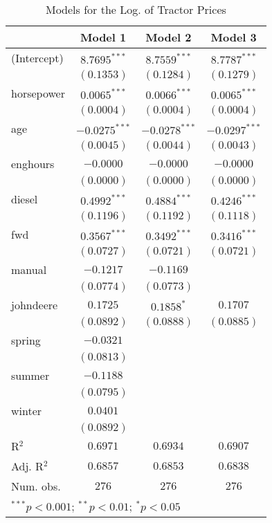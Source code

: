 
\begin{table}
\begin{center}
\begin{tabular}{l c c c}
\hline
 & Model 1 & Model 2 & Model 3 \\
\hline
(Intercept) & $8.7695^{***}$  & $8.7559^{***}$  & $8.7787^{***}$  \\
            & $(0.1353)$      & $(0.1284)$      & $(0.1279)$      \\
horsepower  & $0.0065^{***}$  & $0.0066^{***}$  & $0.0065^{***}$  \\
            & $(0.0004)$      & $(0.0004)$      & $(0.0004)$      \\
age         & $-0.0275^{***}$ & $-0.0278^{***}$ & $-0.0297^{***}$ \\
            & $(0.0045)$      & $(0.0044)$      & $(0.0043)$      \\
enghours    & $-0.0000$       & $-0.0000$       & $-0.0000$       \\
            & $(0.0000)$      & $(0.0000)$      & $(0.0000)$      \\
diesel      & $0.4992^{***}$  & $0.4884^{***}$  & $0.4246^{***}$  \\
            & $(0.1196)$      & $(0.1192)$      & $(0.1118)$      \\
fwd         & $0.3567^{***}$  & $0.3492^{***}$  & $0.3416^{***}$  \\
            & $(0.0727)$      & $(0.0721)$      & $(0.0721)$      \\
manual      & $-0.1217$       & $-0.1169$       &                 \\
            & $(0.0774)$      & $(0.0773)$      &                 \\
johndeere   & $0.1725$        & $0.1858^{*}$    & $0.1707$        \\
            & $(0.0892)$      & $(0.0888)$      & $(0.0885)$      \\
spring      & $-0.0321$       &                 &                 \\
            & $(0.0813)$      &                 &                 \\
summer      & $-0.1188$       &                 &                 \\
            & $(0.0795)$      &                 &                 \\
winter      & $0.0401$        &                 &                 \\
            & $(0.0892)$      &                 &                 \\
\hline
R$^2$       & $0.6971$        & $0.6934$        & $0.6907$        \\
Adj. R$^2$  & $0.6857$        & $0.6853$        & $0.6838$        \\
Num. obs.   & $276$           & $276$           & $276$           \\
\hline
\multicolumn{4}{l}{\scriptsize{$^{***}p<0.001$; $^{**}p<0.01$; $^{*}p<0.05$}}
\end{tabular}
\caption{Models for the Log. of Tractor Prices}
\label{tab:reg_reduction}
\end{center}
\end{table}
